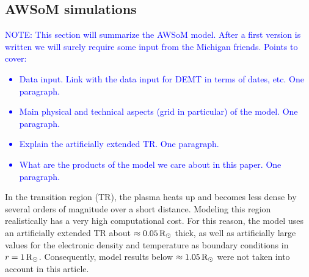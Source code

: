 \documentclass[namedreferences]{solarphysics}
\newcommand{\mrsun}{{\rm R_\odot}}
\def\temp#1{\textcolor{gray}{#1}}
\def\notebyalbert#1{\textcolor{blue}{NOTE: #1}}
\begin{document}
\begin{article}



\subsection{AWSoM simulations}\label{awsom} 

\noindent\notebyalbert{This section will summarize the AWSoM model. After a first version is written we will surely require some input from the Michigan friends. Points to cover:
\begin{itemize}
  \item Data input. Link with the data input for DEMT in terms of dates, etc. One paragraph.
  \item Main physical and technical aspects (grid in particular) of the model.  One paragraph. 
  \item Explain the artificially extended TR. One paragraph.
  \item What are the products of the model we care about in this paper. One paragraph.
\end{itemize}
}

In the transition region {(TR)}, the plasma heats up and becomes less dense {by} several orders of magnitude {over} a short distance. Modeling this region {realistically has a very high computational cost}. For this {reason,} the model uses {an artificially} extended {TR about $\approx 0.05\,\mrsun$ thick, as well as artificially large values for the electronic density and temperature as boundary conditions in $r=1\,\mrsun$.} Consequently, model results below {$\approx 1.05\,\mrsun$} were not taken into account in this article.


\end{article}
\end{document}
